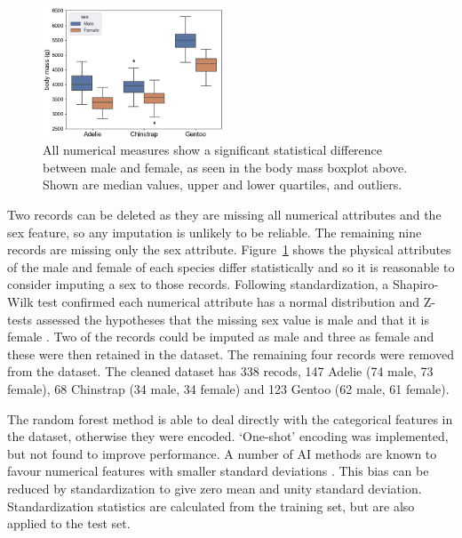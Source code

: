 \documentclass[12pt]{article}
\begin{document}
\begin{figure} %
  \centering
  \vspace{-0.5\baselineskip} %
  \includegraphics[width=0.48\textwidth]{sex.png} %
  \vspace{-0.5\baselineskip} %
  \caption{All numerical measures show a significant statistical difference between male and female, 
  as seen in the body mass boxplot above. Shown are median values, upper and lower quartiles, 
  and outliers.}
  \vspace{-0.5\baselineskip} %
  \label{fig:sex}
\end{figure}   

Two records can be deleted as they are missing all numerical attributes and the sex feature, so 
any imputation is unlikely to be reliable. 
The remaining nine records are missing only the sex attribute. Figure~\ref{fig:sex} shows the physical 
attributes of the male and female of each species differ statistically and so it is reasonable to 
consider imputing a sex to those records. Following standardization, 
a Shapiro-Wilk test confirmed each numerical attribute has a normal distribution \cite{shapiro1965analysis} 
and Z-tests assessed the 
hypotheses that the missing sex value is male and that it is female \cite{freedman2007statistics}. 
Two of the records could be imputed as male and three as female 
and these were then retained in the dataset. 
The remaining four records were removed from the dataset. 
The cleaned dataset has 338 recods, 147 Adelie  
(74 male, 73 female), 68 Chinstrap (34 male, 34 female) and 123 Gentoo  (62 male, 61 female).

The random forest method is able to deal directly with the categorical features in the dataset, 
otherwise they were encoded. `One-shot' encoding was implemented, but not found to improve performance. 
A number of AI methods are known to favour numerical features 
with smaller standard deviations \cite{hastie2009elements}. 
This bias can be reduced by standardization to give zero mean and unity standard deviation. 
Standardization statistics are calculated from the training set, but are also applied to the test set. 
\end{document}
